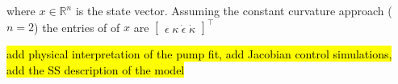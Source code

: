 where $x \in \mathbb{R}^{n}$ is the state vector. Assuming the constant curvature approach ($n = 2$) the entries of of $x$ are $ \begin{bmatrix} \epsilon \hspace{3pt} \kappa \hspace{3pt} \dot{\epsilon}  \hspace{3pt} \dot{\kappa}  \end{bmatrix}^{\top}  $






\hl{add physical interpretation of the pump fit, add Jacobian control simulations, add the SS description of the model}








